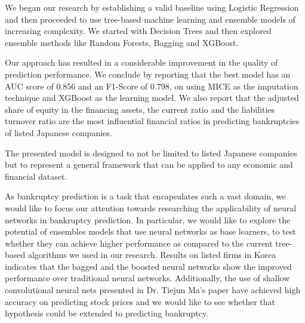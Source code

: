We began our research by establishing a valid baseline using Logistic Regression and then proceeded to use tree-based machine learning and ensemble models of increasing complexity. We started with Decision Trees and then explored ensemble methods like Random Forests, Bagging and XGBoost. 

Our approach has resulted in a considerable improvement in the quality of prediction performance. We conclude by reporting that the best model has an AUC score of 0.856 and an F1-Score of 0.798, on using MICE as the imputation technique and XGBoost as the learning model.
We also report that the adjusted share of equity in the financing assets, the current ratio and the liabilities turnover ratio are the most influential financial ratios in predicting bankruptcies of listed Japanese companies.

The presented model is designed to not be limited to listed Japanese companies but to represent a general framework that can be applied to any economic and financial dataset.


As bankruptcy prediction is a task that encapsulates such a vast domain, we would like to focus our attention towards researching the applicability of neural networks in bankruptcy prediction.
In particular, we would like to explore the potential of ensembles models that use neural networks as base learners, to test whether they can achieve higher performance as compared to the current tree-based algorithms we used in our research. Results on listed firms in Korea \cite{kim2010ensemble} indicates that the bagged and the boosted neural networks show the improved performance over traditional neural networks. 
Additionally, the use of shallow convolutional neural nets presented in Dr. Tiejun Ma's paper \cite{orimoloye2020comparing} have achieved high accuracy on predicting stock prices and we would like to see whether that hypothesis could be extended to predicting bankruptcy.




